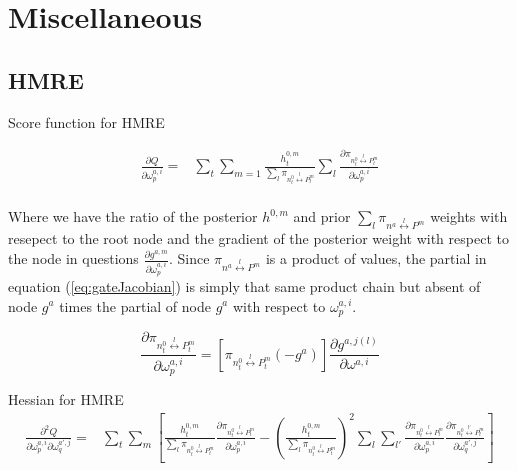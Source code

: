\documentclass[12pt]{article}
\begin{document}
\section{Miscellaneous}


\subsection{HMRE}


Score function for HMRE

\begin{equation} \label{eq:gateJacobian}
  \begin{split}
    \frac{\partial Q}{\partial \omega^{a,i}_{p}} =& \sum_{t} \sum_{m=1}  \frac{h^{0,m}_{t}}{\sum_{l} \pi_{n^{0}_{t} \overset{l}{\longleftrightarrow} P^{m}_{t}}} \sum_{l} \frac{\partial \pi_{n^{0}_{t} \overset{l}{\longleftrightarrow} P^{m}_{t}}}{\partial \omega^{a,i}_{p}} \\
  \end{split}
\end{equation}

Where we have the ratio of the posterior $h^{0,m}$ and prior 
$\sum_{l} \pi_{n^{a} \overset{l}{\longleftrightarrow} P^{m}}$ weights with resepect
to the root node and the gradient of the posterior weight with respect to the node
in questions $\frac{\partial g^{a,m}}{\partial \omega^{a,i}_{p}}$. Since
$\pi_{n^{a} \overset{l}{\longleftrightarrow} P^{m}}$ is a product of values, the
partial in equation (\ref{eq:gateJacobian}) is simply that same product chain but
absent of node $g^a$ times the partial of node $g^a$ with respect to
$\omega^{a,i}_{p}$.

\begin{equation} \label{eq:gatechainpartial}
  \frac{\partial \pi_{n^{0}_{t} \overset{l}{\longleftrightarrow} P^{m}_{t}}}{\partial \omega^{a,i}_{p}} = [\pi_{n^{0}_{t} \overset{l}{\longleftrightarrow} P^{m}_{t}} (-g^{a})] \frac{\partial g^{a, j(l)}}{\partial \omega^{a, i}}
\end{equation}



Hessian for HMRE
\begin{equation}
  \begin{split}
    \frac{\partial^{2} Q}{\partial \omega^{a,i}_{p} \partial \omega^{a',j}_{q}} =& \sum_{t} \sum_{m} \left[  \frac{h^{0,m}_{t}}{\sum_{l} \pi_{n^{0}_{t} \overset{l}{\longleftrightarrow} P^{m}_{t}}} \frac{\partial \pi_{n^{0}_{t} \overset{l}{\longleftrightarrow} P^{m}_{t}}}{\partial \omega^{a,i}_{p}} - \left( \frac{h^{0,m}_{t}}{\sum_{l} \pi_{n^{0}_{t} \overset{l}{\longleftrightarrow} P^{m}_{t}}} \right)^{2} \sum_{l} \sum_{l'} \frac{\partial \pi_{n^{0}_{t} \overset{l}{\longleftrightarrow} P^{m}_{t}}}{\partial \omega^{a,i}_{p}}  \frac{\partial \pi_{n^{0}_{t} \overset{l'}{\longleftrightarrow} P^{m}_{t}}}{\partial \omega^{a',j}_{q}} \right]
  \end{split}
\end{equation}
\end{document}
